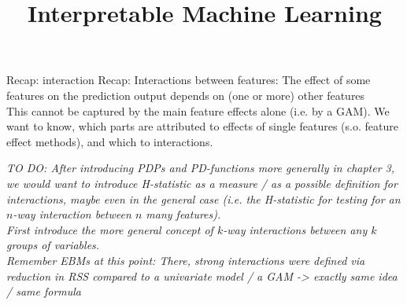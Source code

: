 \documentclass[11pt,compress,t,notes=noshow, aspectratio=169, xcolor=table]{beamer}
\title{Interpretable Machine Learning}
\date{}
\begin{document}

\newcommand{\titlefigure}{figure/open_blackbox}
\newcommand{\learninggoals}{
\item Basic idea of additive functional decompositions
\item Motivation and usefulness of functional decompositions
\item Difficulty of obtaining or even defining a functional decomposition}



\begin{frame}{Recap: interaction}
    Recap: Interactions between features: The effect of some features on the prediction output depends on (one or more) other features \\
    This cannot be captured by the main feature effects alone (i.e. by a GAM).
    We want to know, which parts are attributed to effects of single features (s.o. feature effect methods), and which to interactions.

    \textit{
    TO DO: After introducing PDPs and PD-functions more generally in chapter 3, we would want to introduce H-statistic as a measure / as a possible definition for interactions, maybe even in the general case (i.e. the H-statistic for testing for an \(n\)-way interaction between \(n\) many features). \\
    First introduce the more general concept of \(k\)-way interactions between any \(k\) groups of variables. \\
    Remember EBMs at this point: There, strong interactions were defined via reduction in RSS compared to a univariate model / a GAM -> exactly same idea / same formula
    }

\end{frame}
\end{document}
